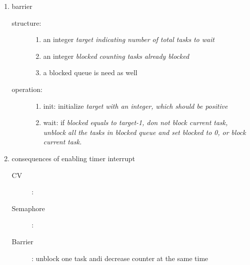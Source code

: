 \documentclass{article}
\begin{document}
\begin{enumerate}
\begin{description}
\begin{enumerate}
    \end{enumerate}
  \end{description}
\item barrier
  \begin{description}
  \item[structure:]
    \begin{enumerate}
      \item an integer \em target \em indicating number of total tasks to wait
      \item an integer \em blocked \em counting tasks already blocked
        \item a blocked queue is need as well
    \end{enumerate}
  \end{description}
    \begin{description}
  \item[operation:]
    \begin{enumerate}
      \item init: initialize \em target \em with an integer, which should be positive
      \item wait: if \em blocked \em equals to \em target-1\em, don not block current task,  unblock all the tasks in blocked queue and set \em blocked \em to 0, or block current task.
    \end{enumerate}
    \end{description}
  \item consequences of enabling timer interrupt
    \begin{description}
    \item[CV]:
    \item[Semaphore]: 
      \item[Barrier]: unblock one task andi decrease counter at the same time
    \end{description}
\end{enumerate}
\end{document}
